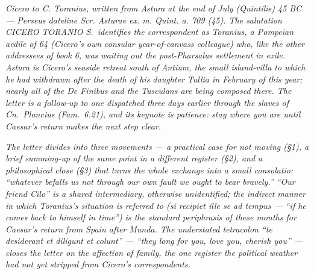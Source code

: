 
\textit{Cicero to C. Toranius, written from Astura at the
end of July (Quintilis) 45 BC --- Perseus dateline
\textit{Scr. Asturae ex. m. Quint. a. 709 (45)}. The
salutation \textit{CICERO TORANIO S.}\ identifies the
correspondent as Toranius, a Pompeian aedile of 64 (Cicero's
own consular year-of-canvass colleague) who, like the other
addressees of book 6, was waiting out the post-Pharsalus
settlement in exile. Astura is Cicero's seaside retreat south
of Antium, the small island-villa to which he had withdrawn
after the death of his daughter Tullia in February of this
year; nearly all of the \textit{De Finibus} and the
\textit{Tusculans} are being composed there. The letter is a
follow-up to one dispatched three days earlier through the
slaves of Cn.\ Plancius (\textit{Fam.}\ 6.21), and its
keynote is patience: stay where you are until Caesar's
return makes the next step clear.}

\textit{The letter divides into three movements --- a
practical case for not moving (\S 1), a brief summing-up
of the same point in a different register (\S 2), and a
philosophical close (\S 3) that turns the whole exchange
into a small \textit{consolatio}: ``whatever befalls us not
through our own fault we ought to bear bravely.'' ``Our
friend Cilo'' is a shared intermediary, otherwise
unidentified; the indirect manner in which Toranius's
situation is referred to (\textit{si recipiet ille se ad
tempus} --- ``if he comes back to himself in time'') is the
standard periphrasis of these months for Caesar's return
from Spain after Munda. The understated tetracolon
``\textit{te desiderant et diligunt et colunt}'' --- ``they
long for you, love you, cherish you'' --- closes the
letter on the affection of family, the one register the
political weather had not yet stripped from Cicero's
correspondents.}
